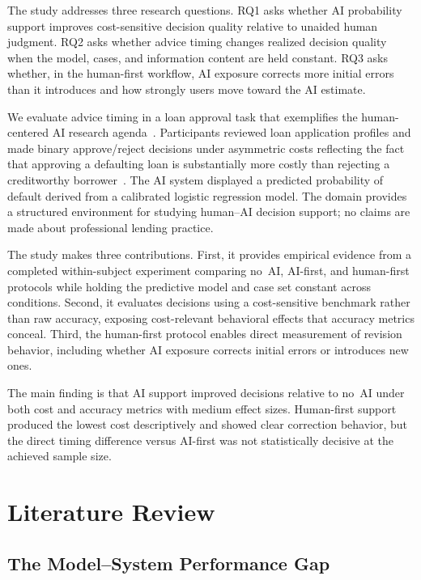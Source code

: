 \documentclass[conference]{IEEEtran}
\begin{document}
The study addresses three research questions. RQ1 asks whether AI
probability support improves cost-sensitive decision quality relative to unaided human judgment. RQ2 asks whether advice timing changes realized decision quality when the model, cases, and information content are held constant. RQ3 asks whether, in the human-first workflow, AI exposure corrects more initial errors than it introduces and how strongly users move toward the AI estimate. 

We evaluate advice timing in a loan approval task that exemplifies the
human-centered AI research agenda~\cite{steyvers2024three}.
Participants reviewed loan application profiles and made binary
approve/reject decisions under asymmetric costs reflecting the fact that
approving a defaulting loan is substantially more costly than rejecting a
creditworthy borrower~\cite{thomas2009consumer}. The AI system displayed
a predicted probability of default derived from a calibrated logistic
regression model. The domain provides a structured environment for
studying human--AI decision support; no claims are made about
professional lending practice.

The study makes three contributions. First, it provides empirical
evidence from a completed within-subject experiment comparing no~AI,
AI-first, and human-first protocols while holding the predictive model
and case set constant across conditions. Second, it evaluates decisions
using a cost-sensitive benchmark rather than raw accuracy, exposing
cost-relevant behavioral effects that accuracy metrics conceal. Third,
the human-first protocol enables direct measurement of revision behavior,
including whether AI exposure corrects initial errors or introduces new
ones.

The main finding is that AI support improved decisions relative to no~AI
under both cost and accuracy metrics with medium effect sizes. Human-first
support produced the lowest cost descriptively and showed clear
correction behavior, but the direct timing difference versus AI-first
was not statistically decisive at the achieved sample size.

\section{Literature Review}
\label{sec:lit}

\subsection{The Model--System Performance Gap}
\end{document}
